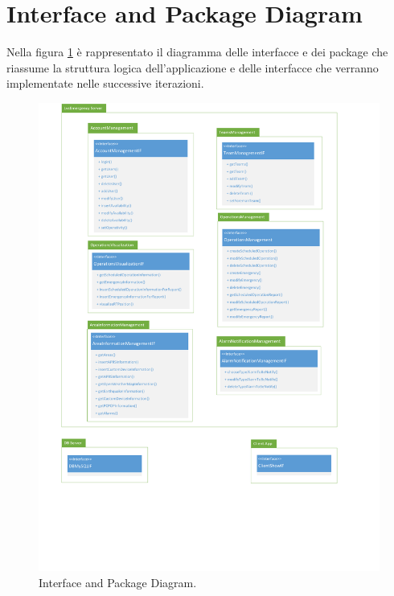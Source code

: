 \section{Interface and Package Diagram}
Nella figura \ref{fig:InterfaceDiagram} è rappresentato il diagramma delle interfacce e dei package che riassume la struttura logica dell'applicazione e delle interfacce che verranno implementate nelle successive iterazioni.

\begin{figure}[h!]
	\centering
	\includegraphics[width=0.8\linewidth]{./Iterazione 1/OtherFiles/UML - Interface diagram}
	\caption{Interface and Package Diagram.}
	\label{fig:InterfaceDiagram}
\end{figure}